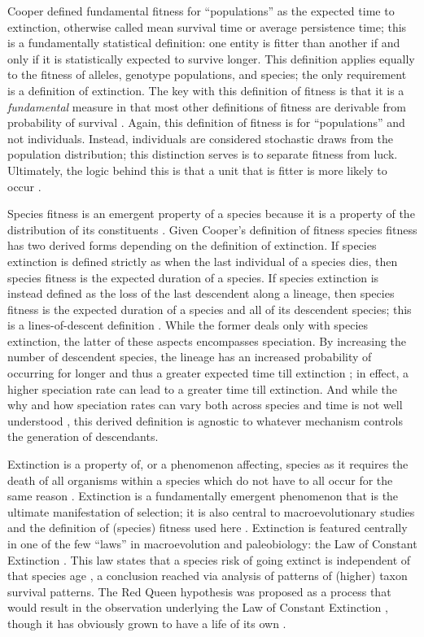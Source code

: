Cooper \citep{Cooper1984} defined fundamental fitness for ``populations'' as the expected time to extinction, otherwise called mean survival time or average persistence time; this is a fundamentally statistical definition: one entity is fitter than another if and only if it is statistically expected to survive longer. This definition applies equally to the fitness of alleles, genotype populations, and species; the only requirement is a  definition of extinction. The key with this definition of fitness is that it is a \textit{fundamental} measure in that most other definitions of fitness are derivable from probability of survival \citep{Cooper1984}. Again, this definition of fitness is for ``populations'' and not individuals. Instead, individuals are considered stochastic draws from the population distribution; this distinction serves is to separate fitness from luck. Ultimately, the logic behind this is that a unit that is fitter is more likely to occur \citep{Cooper1984}.

Species fitness is an emergent property of a species because it is a property of the distribution of its constituents \citep{Jablonski2007}. Given Cooper's definition of fitness \citep{Cooper1984} species fitness has two derived forms depending on the definition of extinction. If species extinction is defined strictly as when the last individual of a species dies, then species fitness is the expected duration of a species. If species extinction is instead defined as the loss of the last descendent along a lineage, then species fitness is the expected duration of a species and all of its descendent species; this is a lines-of-descent definition \citep{Cooper1984}. While the former deals only with species extinction, the latter of these aspects encompasses speciation. By increasing the number of descendent species, the lineage has an increased probability of occurring for longer and thus a greater expected time till extinction \citep{Cooper1984}; in effect, a higher speciation rate can lead to a greater time till extinction. And while the why and how speciation rates can vary both across species and time is not well understood \citep{Rabosky2015c,Rabosky2013e,Coyne2004}, this derived definition is agnostic to whatever mechanism controls the generation of descendants. 

Extinction is a property of, or a phenomenon affecting, species as it requires the death of all organisms within a species which do not have to all occur for the same reason \citep{Simpson2016a}. Extinction is a fundamentally emergent phenomenon that is the ultimate manifestation of selection; it is also central to macroevolutionary studies and the definition of (species) fitness used here \citep{Cooper1984}. Extinction is featured centrally in one of the few ``laws'' in macroevolution and paleobiology: the Law of Constant Extinction \citep{VanValen1973,Liow2011a}. This law states that a species risk of going extinct is independent of that species age \citep{VanValen1973,Liow2011a}, a conclusion reached via analysis of patterns of (higher) taxon survival patterns. The Red Queen hypothesis was proposed as a process that would result in the observation underlying the Law of Constant Extinction \citep{VanValen1973}, though it has obviously grown to have a life of its own \citep{Liow2011a}.

